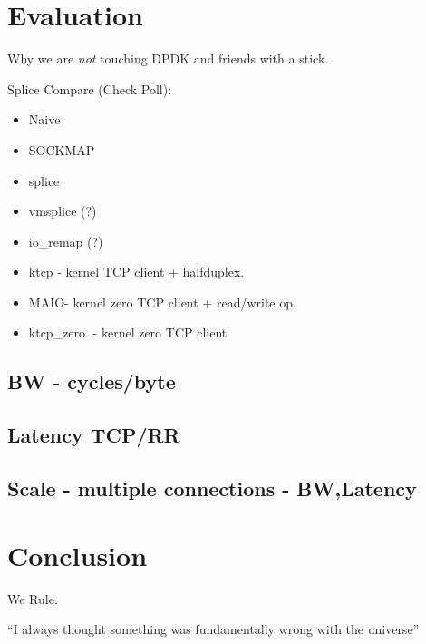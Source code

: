 \documentclass[sigconf,9pt]{acmart}
\newcommand{\oursys}{MAIO\xspace}
\begin{document}
\maketitle
\sloppypar





\section{Evaluation}
Why we are \emph{not} touching DPDK and friends with a stick.

Splice Compare (Check Poll):
\begin{itemize}
    \item Naive
    \item SOCKMAP
    \item splice
    \item vmsplice  (?)
    \item io\_remap (?)
    \item ktcp - kernel TCP client + halfduplex.
    \item \oursys - kernel zero TCP client + read/write op. 
    \item ktcp\_zero. - kernel zero TCP client
\end{itemize}


\subsection{BW - cycles/byte}
\subsection{Latency TCP/RR}
\subsection{Scale - multiple connections - BW,Latency}


\section{Conclusion}
We Rule.

``I always thought something was fundamentally wrong with the universe'' \citep{adams1995hitchhiker}



\end{document}

